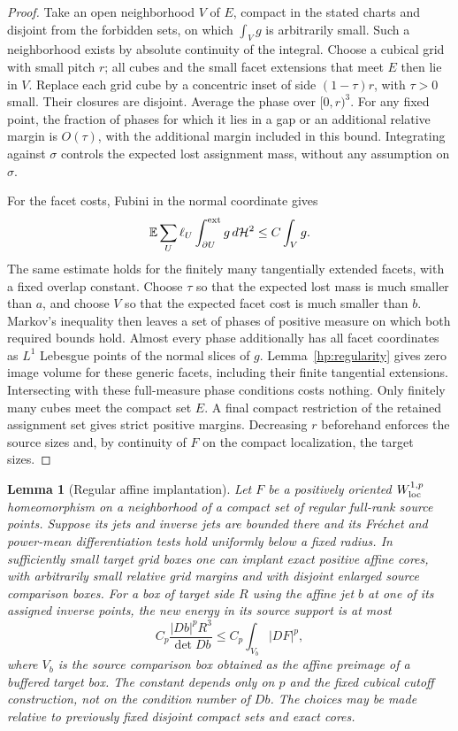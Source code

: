 \documentclass[11pt]{article}
\numberwithin{equation}{section}
\newtheorem{lemma}[theorem]{Lemma}
\theoremstyle{definition}
\theoremstyle{remark}
\begin{document}
\begin{proof}
Take an open neighborhood $V$ of $E$, compact in the stated charts and
disjoint from the forbidden sets, on which $\int_Vg$ is arbitrarily
small.  Such a neighborhood exists by absolute continuity of the
integral.  Choose a cubical grid with small pitch $r$; all cubes and
the small facet extensions that meet $E$ then lie in $V$.  Replace
each grid cube by a concentric inset of side $(1-\tau)r$, with
$\tau>0$ small.  Their closures are disjoint.  Average the phase over
$[0,r)^3$.  For any fixed point, the fraction of phases for which it
lies in a gap or an additional relative margin is $O(\tau)$, with
the additional margin included in this bound.  Integrating against
$\sigma$ controls the expected lost assignment mass, without any
assumption on $\sigma$.

For the facet costs, Fubini in the normal coordinate gives
\[
 \mathbb E\sum_U\ell_U
       \int_{\partial U}^{\rm ext}g\,d\mathcal H^2
       \leq C\int_Vg.
\]
The same estimate holds for the finitely many tangentially extended
facets, with a fixed overlap constant.  Choose $\tau$ so that the
expected lost mass is much smaller than $a$, and choose $V$ so that
the expected facet cost is much smaller than $b$.  Markov's
inequality then leaves a set of phases of positive measure on which
both required bounds hold.  Almost every phase additionally has all
facet coordinates as $L^1$ Lebesgue points of the normal slices of
$g$.  Lemma~\ref{hp:regularity} gives zero image volume for these
generic facets, including their finite tangential extensions.
Intersecting with these full-measure phase conditions costs nothing.
Only finitely many cubes meet the compact set $E$.  A final compact
restriction of the retained assignment set gives strict positive
margins.  Decreasing $r$ beforehand enforces the source sizes and,
by continuity of $F$ on the compact localization, the target sizes.
\end{proof}

\begin{lemma}[Regular affine implantation]\label{hp:regular-implant}
Let $F$ be a positively oriented $W^{1,p}_{\rm loc}$ homeomorphism
on a neighborhood of a compact set of regular full-rank source
points.  Suppose its jets and inverse jets are bounded there and its
Fr\'echet and power-mean differentiation tests hold uniformly below
a fixed radius.  In sufficiently small target grid boxes one can
implant exact positive affine cores, with arbitrarily small relative
grid margins and with disjoint enlarged source comparison boxes.
For a box of target side $R$ using the affine jet $b$ at one of its
assigned inverse points, the new energy in its source support is at
most
\begin{equation}\label{hp:regular-implant-cost}
 C_p\frac{|Db|^pR^3}{\det Db}
 \leq C_p\int_{V_b}|DF|^p,
\end{equation}
where $V_b$ is the source comparison box obtained as the affine
preimage of a buffered target box.  The constant depends only
on $p$ and the fixed cubical cutoff construction, not on the condition
number of $Db$.  The choices may be made relative to previously
fixed disjoint compact sets and exact cores.
\end{lemma}
\end{document}
